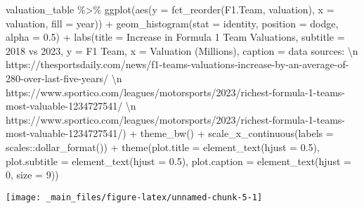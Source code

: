 \documentclass[
]{book}
\newenvironment{Shaded}{\begin{snugshade}}{\end{snugshade}}
\newcommand{\AttributeTok}[1]{\textcolor[rgb]{0.77,0.63,0.00}{#1}}
\newcommand{\DecValTok}[1]{\textcolor[rgb]{0.00,0.00,0.81}{#1}}
\newcommand{\FloatTok}[1]{\textcolor[rgb]{0.00,0.00,0.81}{#1}}
\newcommand{\FunctionTok}[1]{\textcolor[rgb]{0.00,0.00,0.00}{#1}}
\newcommand{\NormalTok}[1]{#1}
\newcommand{\SpecialCharTok}[1]{\textcolor[rgb]{0.00,0.00,0.00}{#1}}
\newcommand{\StringTok}[1]{\textcolor[rgb]{0.31,0.60,0.02}{#1}}
\begin{document}
\begin{Shaded}
\begin{Highlighting}[]
\NormalTok{valuation\_table }\SpecialCharTok{\%\textgreater{}\%}
  \FunctionTok{ggplot}\NormalTok{(}\FunctionTok{aes}\NormalTok{(}\AttributeTok{y =} \FunctionTok{fct\_reorder}\NormalTok{(F1.Team, valuation), }\AttributeTok{x =}\NormalTok{ valuation, }\AttributeTok{fill =}\NormalTok{ year)) }\SpecialCharTok{+}
  \FunctionTok{geom\_histogram}\NormalTok{(}\AttributeTok{stat =} \StringTok{\textquotesingle{}identity\textquotesingle{}}\NormalTok{, }\AttributeTok{position =} \StringTok{\textquotesingle{}dodge\textquotesingle{}}\NormalTok{, }\AttributeTok{alpha =} \FloatTok{0.5}\NormalTok{) }\SpecialCharTok{+}
  \FunctionTok{labs}\NormalTok{(}\AttributeTok{title =} \StringTok{\textquotesingle{}Increase in Formula 1 Team Valuations\textquotesingle{}}\NormalTok{,}
       \AttributeTok{subtitle =} \StringTok{\textquotesingle{}2018 vs 2023\textquotesingle{}}\NormalTok{,}
       \AttributeTok{y =} \StringTok{\textquotesingle{}F1 Team\textquotesingle{}}\NormalTok{,}
       \AttributeTok{x =} \StringTok{\textquotesingle{}Valuation (Millions)\textquotesingle{}}\NormalTok{,}
       \AttributeTok{caption =} \StringTok{\textquotesingle{}data sources:  }\SpecialCharTok{\textbackslash{}n}\StringTok{ https://thesportsdaily.com/news/f1{-}teams{-}valuations{-}increase{-}by{-}an{-}average{-}of{-}280{-}over{-}last{-}five{-}years/ }\SpecialCharTok{\textbackslash{}n}\StringTok{ https://www.sportico.com/leagues/motorsports/2023/richest{-}formula{-}1{-}teams{-}most{-}valuable{-}1234727541/ }\SpecialCharTok{\textbackslash{}n}\StringTok{ https://www.sportico.com/leagues/motorsports/2023/richest{-}formula{-}1{-}teams{-}most{-}valuable{-}1234727541/\textquotesingle{}}\NormalTok{) }\SpecialCharTok{+}
  \FunctionTok{theme\_bw}\NormalTok{() }\SpecialCharTok{+}
  \FunctionTok{scale\_x\_continuous}\NormalTok{(}\AttributeTok{labels =}\NormalTok{ scales}\SpecialCharTok{::}\FunctionTok{dollar\_format}\NormalTok{()) }\SpecialCharTok{+}
  \FunctionTok{theme}\NormalTok{(}\AttributeTok{plot.title =} \FunctionTok{element\_text}\NormalTok{(}\AttributeTok{hjust =} \FloatTok{0.5}\NormalTok{),}
        \AttributeTok{plot.subtitle =} \FunctionTok{element\_text}\NormalTok{(}\AttributeTok{hjust =} \FloatTok{0.5}\NormalTok{),}
        \AttributeTok{plot.caption =} \FunctionTok{element\_text}\NormalTok{(}\AttributeTok{hjust =} \DecValTok{0}\NormalTok{, }\AttributeTok{size =} \DecValTok{9}\NormalTok{))}
\end{Highlighting}
\end{Shaded}

\begin{center}\texttt{[image: \_main\_files/figure-latex/unnamed-chunk-5-1]} \end{center}
\end{document}
